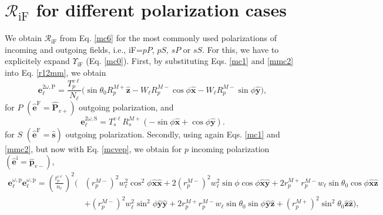 
\section{\texorpdfstring{$\mathcal{R}_{\mathrm{iF}}$}{R} for different
polarization cases}\label{sec:rcases}

We obtain $\mathcal{R}_{\mathrm{iF}}$ from Eq. \eqref{mc6} for the most commonly
used polarizations of incoming and outgoing fields, i.e., iF=$pP$, $pS$, $sP$ or
$sS$. For this, we have to explicitely expand $\Upsilon_{\mathrm{iF}}$ (Eq.
\eqref{mc0}). First, by substituting Eqs. \eqref{mc1} and \eqref{mmc2} into Eq.
\eqref{r12mm}, we obtain
\begin{equation}\label{eq:e2wpmr}
\mathbf{e}^{2\omega,\mathrm{P}}_{\ell} =
\frac{T^{v\ell}_{p}}{N_{\ell}}
\big(
  \sin\theta_{0}R^{M+}_{p}\hat{\mathbf{z}}
- W_{\ell}R^{M-}_{p}\cos\phi\hat{\mathbf{x}}
- W_{\ell}R^{M-}_{p}\sin\phi\hat{\mathbf{y}}
\big),
\end{equation}
for $P$ $(\hat{\mathbf{e}}^{\mathrm{F}} = \hat{\mathbf{P}}_{v+})$ outgoing
polarization, and
\begin{equation}\label{eq:e2wsmr}
\mathbf{e}^{2\omega,\mathrm{S}}_{\ell} =
T_{s}^{v\ell}R^{M+}_{s}
\left(
- \sin\phi\hat{\mathbf{x}}
+ \cos\phi\hat{\mathbf{y}}
\right).
\end{equation}
for $S$ $(\hat{\mathbf{e}}^{\mathrm{F}}=\hat{\mathbf{s}})$ outgoing
polarization. Secondly, using again Eqs. \eqref{mc1} and \eqref{mmc2}, but now
with Eq. \eqref{mcvep}, we obtain for $p$ incoming polarization
$(\hat{\mathbf{e}}^{\mathrm{i}} = \hat{\mathbf{p}}_{v-})$,
\begin{equation}\label{eq:ewewpmr}
\begin{split}
\mathbf{e}^{\omega,\mathrm{p}}_{\ell}\mathbf{e}^{\omega,\mathrm{p}}_{\ell} =
\left(\frac{t^{v\ell}_{p}}{n_{\ell}}\right)^{2}
\bigg(&
   \left(r^{M-}_{p}\right)^{2}w^{2}_{\ell}\cos^{2}\phi
   \hat{\mathbf{x}}\hat{\mathbf{x}}
 + 2\left(r^{M-}_{p}\right)^{2}w^{2}_{\ell}\sin\phi\cos\phi
   \hat{\mathbf{x}}\hat{\mathbf{y}}
 + 2r^{M+}_{p}r^{M-}_{p}w_{\ell}\sin\theta_{0}\cos\phi
   \hat{\mathbf{x}}\hat{\mathbf{z}}\\
&+ \left(r^{M-}_{p}\right)^{2}w^{2}_{\ell}\sin^{2}\phi
   \hat{\mathbf{y}}\hat{\mathbf{y}}
 + 2r^{M+}_{p}r^{M-}_{p}w_{\ell}\sin\theta_{0}\sin\phi
   \hat{\mathbf{y}}\hat{\mathbf{z}}
 + \left(r^{M+}_{p}\right)^{2}\sin^{2}\theta_{0}
   \hat{\mathbf{z}}\hat{\mathbf{z}}
\bigg),
\end{split}
\end{equation}
